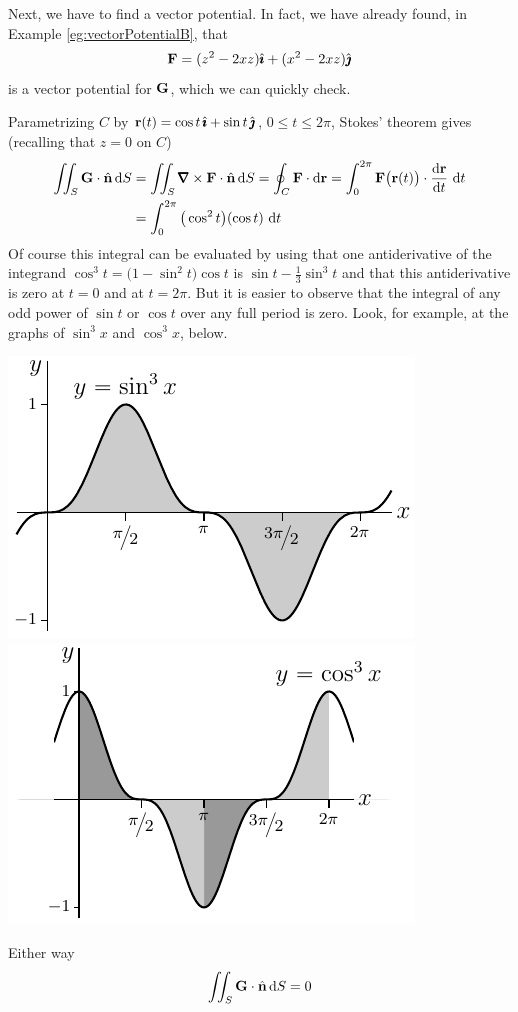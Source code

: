 \begin{eg}
Next, we have to find a vector potential.
In fact, we have already found, in Example \ref{eg:vectorPotentialB}, that
\begin{equation*}
\mathbf{F} = (z^2-2xz) \hat{\pmb{\imath}} +(x^2-2xz)\hat{\pmb{\jmath}}
\end{equation*}
is a vector potential for $\mathbf{G}$, which we can quickly check.

Parametrizing $C$ by
$\mathbf{r}(t) = \cos t\,\hat{\pmb{\imath}}+\sin t\,\hat{\pmb{\jmath}}$, $0\le t\le 2\pi$,
Stokes' theorem gives (recalling that $z=0$ on $C$)
\begin{align*}
\dblInt_S\vG\cdot\hn\,\dee{S}
&= \dblInt_S\vnabla\times\vF\cdot\hn\,\dee{S}
= \oint_C \vF\cdot\dee{\vr}
=\int_0^{2\pi} \vF\big(\vr(t)\big)\cdot\diff{\vr}{t}\ \dee{t} \\
&= \int_0^{2\pi} \big(\cos^2 t\big)(\cos t)\ \dee{t}
\end{align*} 
Of course this integral can be evaluated by using that
one antiderivative of the integrand $\cos^3 t =\big(1-\sin^2t\big)\cos t$
is $\sin t-\frac{1}{3}\sin^3 t$ and that this antiderivative 
is zero at $t=0$ and at $t=2\pi$. But it is easier to observe that the
integral of any odd power of $\sin t$ or $\cos t$ over any full period
is zero. Look, for example, at the graphs of $\sin^3x$ and $\cos^3x$, below.
\begin{wfig}
\begin{center}
    \includegraphics{sin3Graph.pdf}\qquad\quad
    \includegraphics{cos3Graph.pdf}
\end{center}
\end{wfig}
Either way
\begin{align*}
\iint_S\mathbf{G}\cdot\hat{\mathbf{n}}\,\mathrm{d}S
=0
\end{align*} 
\end{eg}
